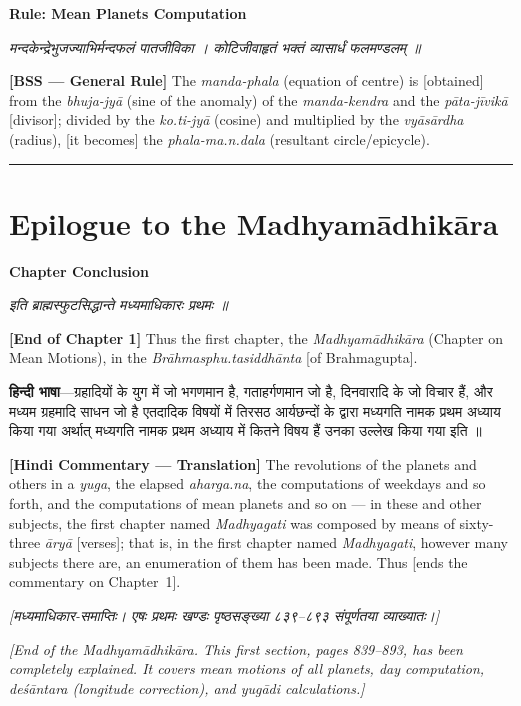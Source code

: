\documentclass[11pt,a4paper]{book}
\newcommand{\dev}[1]{{\devanagarifont #1}}
\newcommand{\bilingual}[2]{%
  \par\vspace{0.6em}%
  \noindent\begin{minipage}[t]{0.48\textwidth}
    \RaggedRight
    #1%
  \end{minipage}%
  \hfill
  \begin{minipage}[t]{0.48\textwidth}
    \RaggedRight
    #2%
  \end{minipage}%
  \par\vspace{0.6em}%
}
\newcommand{\shlokabilingual}[2]{%
  \par\vspace{0.8em}%
  \noindent\begin{minipage}[t]{0.48\textwidth}
    \RaggedRight
    \dev{\textit{#1}}
  \end{minipage}%
  \hfill
  \begin{minipage}[t]{0.48\textwidth}
    \RaggedRight
    #2%
  \end{minipage}%
  \par\vspace{0.8em}%
}
\newcommand{\hindicommbilingual}[2]{%
  \par\vspace{0.5em}%
  \noindent\begin{minipage}[t]{0.48\textwidth}
    \RaggedRight\small
    \dev{#1}
  \end{minipage}%
  \hfill
  \begin{minipage}[t]{0.48\textwidth}
    \RaggedRight\small
    #2%
  \end{minipage}%
  \par\vspace{0.5em}%
}
\newcommand{\ruleheadingbilingual}[2]{%
  \par\vspace{0.8em}%
  \noindent\begin{minipage}[t]{0.48\textwidth}
    \textbf{\color{sectioncolor}\dev{#1}}
  \end{minipage}%
  \hfill
  \begin{minipage}[t]{0.48\textwidth}
    \textbf{\color{sectioncolor}#2}
  \end{minipage}%
  \par\vspace{0.4em}%
}
\newcommand{\secdivider}{%
  \begin{center}\rule{0.4\textwidth}{0.5pt}\end{center}%
}
\begin{document}
\ruleheadingbilingual{नियमः मध्यमग्रहसाधनम्‌}{Rule: Mean Planets Computation}

\shlokabilingual{%
मन्दकेन्द्रेभुजज्याभिर्मन्दफलं पातजीविका ।
कोटिजीवाहृतं भक्तं व्यासार्धं फलमण्डलम्‌ ॥
}{%
\textbf{[BSS --- General Rule]} The \textit{manda-phala} (equation of centre) is [obtained] from the \textit{bhuja-jyā} (sine of the anomaly) of the \textit{manda-kendra} and the \textit{pāta-jīvikā} [divisor]; divided by the \textit{ko.ti-jyā} (cosine) and multiplied by the \textit{vyāsārdha} (radius), [it becomes] the \textit{phala-ma.n.dala} (resultant circle/epicycle).
}

\secdivider
\clearpage

\section{Epilogue to the Madhyamādhikāra}

\ruleheadingbilingual{अध्यायोपसंहारः}{Chapter Conclusion}

\shlokabilingual{%
इति ब्राह्मस्फुटसिद्धान्ते मध्यमाधिकारः प्रथमः ॥
}{%
\textbf{[End of Chapter 1]} Thus the first chapter, the \textit{Madhyamādhikāra} (Chapter on Mean Motions), in the \textit{Brāhmasphu.tasiddhānta} [of Brahmagupta].
}

\hindicommbilingual{%
\textbf{हिन्दी भाषा}---ग्रहादियों के युग में जो भगणमान है, गताहर्गणमान जो है, दिनवारादि के जो विचार हैं, और मध्यम ग्रहमादि साधन जो है एतदादिक विषयों में तिरसठ आर्यछन्दों के द्वारा मध्यगति नामक प्रथम अध्याय किया गया अर्थात्‌ मध्यगति नामक प्रथम अध्याय में कितने विषय हैं उनका उल्लेख किया गया इति ॥
}{%
\textbf{[Hindi Commentary --- Translation]} The revolutions of the planets and others in a \textit{yuga}, the elapsed \textit{aharga.na}, the computations of weekdays and so forth, and the computations of mean planets and so on --- in these and other subjects, the first chapter named \textit{Madhyagati} was composed by means of sixty-three \textit{āryā} [verses]; that is, in the first chapter named \textit{Madhyagati}, however many subjects there are, an enumeration of them has been made. Thus [ends the commentary on Chapter~1].
}

\vspace{1em}
\bilingual{%
\textit{[मध्यमाधिकार-समाप्तिः। एषः प्रथमः खण्डः पृष्ठसङ्ख्या ८३९--८९३ संपूर्णतया व्याख्यातः।]}
}{%
\textit{[End of the Madhyamādhikāra. This first section, pages 839--893, has been completely explained. It covers mean motions of all planets, day computation, \textit{deśāntara} (longitude correction), and \textit{yugādi} calculations.]}
}
\end{document}
